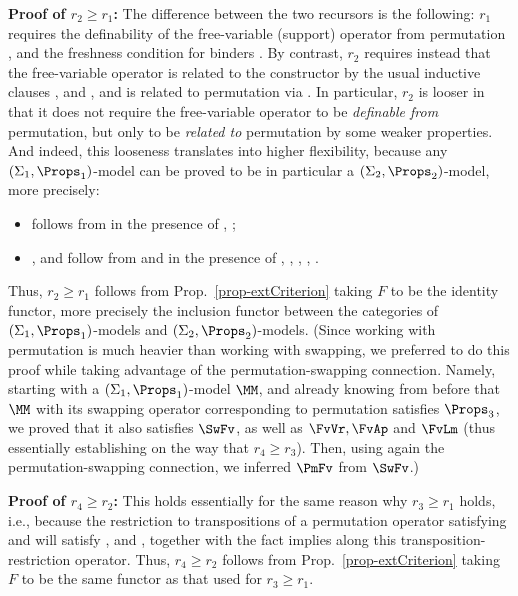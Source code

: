 	\textbf{Proof of $r_2 \geq r_1$:} 
	The difference between the two recursors is the following: $r_1$ requires the definability of the free-variable (support) operator from  permutation \FvDPm{},  and the freshness condition for binders \FCB{}. By contrast, $r_2$ requires instead that the free-variable operator is related to the constructor by the usual inductive clauses \FvVr{}, \FvAp{} and \FvLm{}, and is related to permutation via \PmFv{}. 
	In particular, $r_2$ is looser in that it does not require the free-variable operator to be \emph{definable from} permutation, but only to be \emph{related to} permutation by some weaker properties. And indeed, this looseness translates into higher flexibility, because any $(\Sigma_1,\Props_1)$-model can be proved to be in particular a $(\Sigma_2,\Props_2)$-model, more precisely:
	\begin{itemize} 
		\item \PmFv{} follows from \FvDPm{} in the presence of \PmId{}, \PmCp{}; 
		\item \FvVr{}, \FvAp{} and \FvLm{} follow from \FvDPm{} and \FCB{} 
		in the presence of \PmId{}, \PmCp{}, \PmVr{}, \PmAp{}, \PmLm{}.
	\end{itemize} 	
	Thus, $r_2 \geq r_1$ follows from Prop.~\ref{prop-extCriterion} taking $F$ to be the identity functor, more precisely the inclusion functor between the categories 
	of $(\Sigma_1,\Props_1)$-models and $(\Sigma_2,\Props_2)$-models. 
	(Since working with permutation is much heavier than working with swapping, 
	we preferred to do this proof while taking advantage of the permutation-swapping connection. Namely, starting with a $(\Sigma_1,\Props_1)$-model $\MM$, and already knowing from before that $\MM$ with 
	its swapping operator corresponding to permutation satisfies $\Props_3$, 
	we proved that it also satisfies $\SwFv$, %
	as well as $\FvVr,\FvAp$ and $\FvLm$ (thus essentially establishing on the way that $r_4 \geq r_3$).  
	Then, using again the permutation-swapping connection, we inferred $\PmFv$ %
	from $\SwFv$.) 
	
	\textbf{Proof of $r_4\geq r_2$:} This %
	holds essentially for the same reason why $r_3\geq r_1$ holds, i.e., because the 
	restriction to transpositions of a permutation operator satisfying \PmId{} and \PmCp{} will satisfy \SwId{}, \SwIv{} and \SwCp{}, together with the fact \PmFv{} implies \SwFv{} along this transposition-restriction operator.  
		Thus, $r_4\geq r_2$ follows from Prop.~\ref{prop-extCriterion} taking $F$ to be the same functor  
		as that used for $r_3\geq r_1$.   
	

